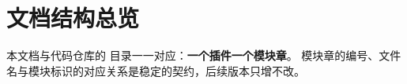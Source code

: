 
\chapter*{文档结构总览}

本文档与代码仓库的  目录一一对应：\textbf{一个插件一个模块章}。
模块章的编号、文件名与模块标识的对应关系是稳定的契约，后续版本只增不改。

\vspace{0.5em}
\small
